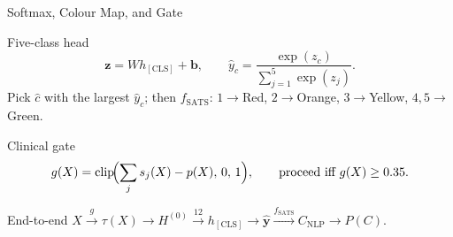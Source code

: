 \begin{frame}{Softmax, Colour Map, and Gate}
	\begin{block}{Five-class head}
		\[
		  \mathbf{z} = W h_{\mathrm{[CLS]}} + \mathbf{b},
		  \qquad
		  \hat{y}_c = \frac{\exp(z_c)}{\sum_{j=1}^{5}\exp(z_j)}.
		\]
		Pick \(\hat{c}\) with the largest \(\hat{y}_c\); then \(f_{\mathrm{SATS}}\): \(1\to\)Red, \(2\to\)Orange, \(3\to\)Yellow, \(4{,}5\to\)Green.
	\end{block}
	\begin{block}{Clinical gate}
		\[
		  g(X) = \mathrm{clip}\!\Bigl(\sum_j s_j(X) - p(X),\, 0,\, 1\Bigr),
		  \qquad \text{proceed iff } g(X) \geq 0.35.
		\]
	\end{block}
	\begin{alertblock}{End-to-end}
		\(X \xrightarrow{g} \tau(X) \to H^{(0)} \xrightarrow{12} h_{\mathrm{[CLS]}} \to \hat{\mathbf{y}} \xrightarrow{f_{\mathrm{SATS}}} C_{\mathrm{NLP}} \to P(C)\).
	\end{alertblock}
\end{frame}
